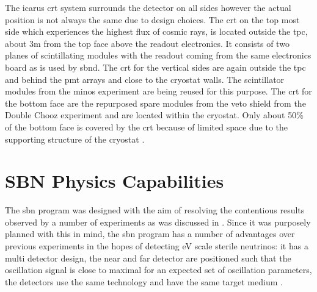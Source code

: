 The \gls{icarus} \gls{crt} system surrounds the detector on all sides however the actual position is not always the same due to design choices. The \gls{crt} on the top most side which experiences the highest flux of cosmic rays, is located outside the \gls{tpc}, about 3m from the top face above the readout electronics. It consists of two planes of scintillating modules with the readout coming from the same electronics board as is used by \gls{sbnd}.
The \gls{crt} for the vertical sides are again outside the \gls{tpc} and behind the \gls{pmt} arrays and close to the cryostat walls. The scintillator modules from the \gls{minos} experiment are being reused for this purpose. The \gls{crt} for the bottom face are the repurposed spare modules from the veto shield from the Double Chooz experiment and are located within the cryostat. Only about 50\% of the bottom face is covered by the \gls{crt} because of limited space due to the supporting structure of the cryostat \cite{SBN_Proposal}\cite{ICARUS_CRT}.


\section{SBN Physics Capabilities}\label{sec:sbn_physics_capabilities}

The \gls{sbn} program was designed with the aim of resolving the contentious results observed by a number of experiments as was discussed in . Since it was purposely planned with this in mind, the \gls{sbn} program has a number of advantages over previous experiments in the hopes of detecting eV scale sterile neutrinos: it has a multi detector design, the near and far detector are positioned such that the oscillation signal is close to maximal for an expected set of oscillation parameters, the detectors use the same technology and have the same target medium \cite{SBN_paper}. 

